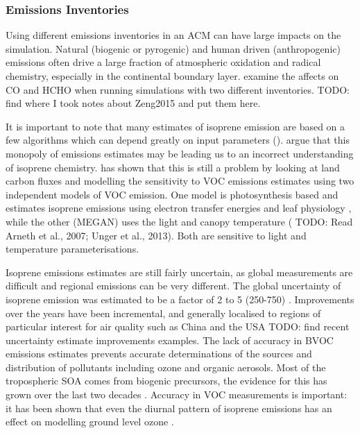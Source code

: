     
    \subsubsection{Emissions Inventories}
      Using different emissions inventories in an ACM can have large impacts on the simulation.
      Natural (biogenic or pyrogenic) and human driven (anthropogenic) emissions often drive a large fraction of atmospheric oxidation and radical chemistry, especially in the continental boundary layer.
      \cite{Zeng2015} examine the affects on CO and HCHO when running simulations with two different inventories.
      TODO: find where I took notes about Zeng2015 and put them here.
      
      It is important to note that many estimates of isoprene emission are based on a few algorithms which can depend greatly on input parameters (\cite{Arneth2008,Niinemets2010}).
      \cite{Arneth2008} argue that this monopoly of emissions estimates may be leading us to an incorrect understanding of isoprene chemistry.
      \cite{Yue2015} has shown that this is still a problem by looking at land carbon fluxes and modelling the sensitivity to VOC emissions estimates using two independent models of VOC emission.
      One model is photosynthesis based and estimates isoprene emissions using electron transfer energies and leaf physiology \citep{Niinemets1999}, while the other (MEGAN) uses the light and canopy temperature (\citep{Guenther1995,Arneth2007} TODO: Read Arneth et al., 2007; Unger et al., 2013).
      Both are sensitive to light and temperature parameterisations.
      
      Isoprene emissions estimates are still fairly uncertain, as global measurements are difficult and regional emissions can be very different. 
      The global uncertainty of isoprene emission was estimated to be a factor of 2 to 5 (250-750\tgpyr) \citep{Kanakidou2005}.
      Improvements over the years have been incremental, and generally localised to regions of particular interest for air quality such as China and the USA TODO: find recent uncertainty estimate improvements examples.
      The lack of accuracy in BVOC emissions estimates prevents accurate determinations of the sources and distribution of pollutants including ozone and organic aerosols.
      Most of the tropospheric SOA comes from biogenic precursors, the evidence for this has grown over the last two decades \citep{Guenther1995, Kanakidou2005,Guenther2012}.
      Accuracy in VOC measurements is important: it has been shown that even the diurnal pattern of isoprene emissions has an effect on modelling ground level ozone \citep{Hewitt2011, Fan2004}.
      
